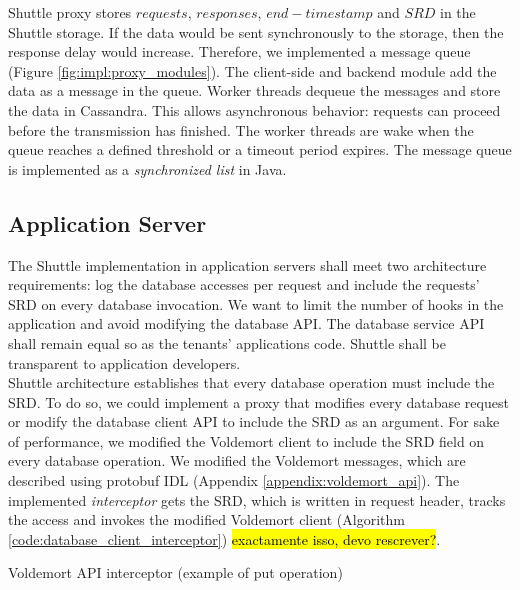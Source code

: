 Shuttle proxy stores $requests$, $responses$, $end-timestamp$ and $SRD$ in the Shuttle storage. If the data would be sent synchronously to the storage, then the response delay would increase. Therefore, we implemented a message queue (Figure \ref{fig:impl:proxy_modules}). The client-side and backend module add the data as a message in the queue. Worker threads dequeue the messages and store the data in Cassandra. This allows asynchronous behavior: requests can proceed before the transmission has finished. The worker threads are wake when the queue reaches a defined threshold or a timeout period expires. The message queue is implemented as a \emph{synchronized list} in Java.


\subsection{Application Server}\label{sec:impl:normal:compute}
The Shuttle implementation in application servers shall meet two architecture requirements: log the database accesses per request and include the requests' \ac{SRD} on every database invocation. We want to limit the number of hooks in the application and avoid modifying the database \ac{API}. The database service \ac{API} shall remain equal so as the tenants' applications code. Shuttle shall be transparent to application developers.\\


Shuttle architecture establishes that every database operation must include the \acf{SRD}. To do so, we could implement a proxy that modifies every database request or modify the database client \ac{API} to include the \ac{SRD} as an argument. For sake of performance, we modified the Voldemort client to include the \ac{SRD} field on every database operation. We modified the Voldemort messages, which are described using \acf{protobuf} \acs{IDL} (Appendix \ref{appendix:voldemort_api}). The implemented \emph{interceptor} gets the \ac{SRD}, which is written in request header, tracks the access and invokes the modified Voldemort client (Algorithm \ref{code:database_client_interceptor}) \hl{exactamente isso, devo rescrever?}.

\begin{algorithm}
\DontPrintSemicolon{}
 
\caption{Voldemort \ac{API} interceptor (example of put operation)}\label{code:database_client_interceptor}
\end{algorithm}

